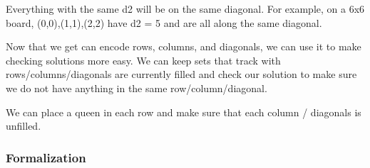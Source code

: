 \documentclass[11pt,oneside]{book}
\begin{document}
Everything with the same d2 will be on the same diagonal. For example, on a 6x6 board, (0,0),(1,1),(2,2) have d2 = 5 and are all along the same diagonal.

Now that we get can encode rows, columns, and diagonals, we can use it to make checking solutions more easy. We can keep sets that track with rows/columns/diagonals are currently filled and check our solution to make sure we do not have anything in the same row/column/diagonal.

We can place a queen in each row and make sure that each column / diagonals is unfilled.

\subsubsection{Formalization}
\end{document}
